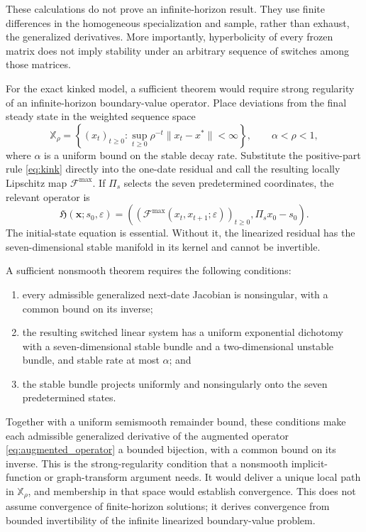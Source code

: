 \documentclass[11pt]{article}
\begin{document}
These calculations do not prove an infinite-horizon result.  They use finite
differences in the homogeneous specialization and sample, rather than exhaust,
the generalized derivatives.  More importantly, hyperbolicity of every frozen
matrix does not imply stability under an arbitrary sequence of switches among
those matrices.

For the exact kinked model, a sufficient theorem would require strong
regularity of an infinite-horizon boundary-value operator.  Place deviations
from the final steady state in the weighted sequence space
\begin{equation}
 \mathbb X_\rho=\left\{(x_t)_{t\geq0}:
 \sup_{t\geq0}\rho^{-t}\lVert x_t-x^*\rVert<\infty\right\},
 \qquad \alpha<\rho<1,
 \label{eq:weighted_space}
\end{equation}
where $\alpha$ is a uniform bound on the stable decay rate.  Substitute the
positive-part rule \eqref{eq:kink} directly into the one-date residual and call
the resulting locally Lipschitz map $\mathcal F^{\max}$.  If $\Pi_s$ selects
the seven predetermined coordinates, the relevant operator is
\begin{equation}
 \mathfrak H(\boldsymbol x;s_0,\varepsilon)=
 \left(
 (\mathcal F^{\max}(x_t,x_{t+1};\varepsilon))_{t\geq0},
 \Pi_sx_0-s_0
 \right).
 \label{eq:augmented_operator}
\end{equation}
The initial-state equation is essential.  Without it, the linearized residual
has the seven-dimensional stable manifold in its kernel and cannot be
invertible.

A sufficient nonsmooth theorem requires the following conditions:
\begin{enumerate}
 \item every admissible generalized next-date Jacobian is nonsingular, with a
 common bound on its inverse;
 \item the resulting switched linear system has a uniform exponential
 dichotomy with a seven-dimensional stable bundle and a two-dimensional
 unstable bundle, and stable rate at most $\alpha$; and
 \item the stable bundle projects uniformly and nonsingularly onto the seven
 predetermined states.
\end{enumerate}
Together with a uniform semismooth remainder bound, these conditions make each
admissible generalized derivative of the augmented operator
\eqref{eq:augmented_operator} a bounded bijection, with a common bound on its
inverse.  This is the strong-regularity condition that a nonsmooth implicit-
function or graph-transform argument needs.  It would deliver a unique local
path in $\mathbb X_\rho$, and membership in that space would establish
convergence.  This does not assume convergence of finite-horizon solutions; it
derives convergence from bounded invertibility of the infinite linearized
boundary-value problem.
\end{document}
